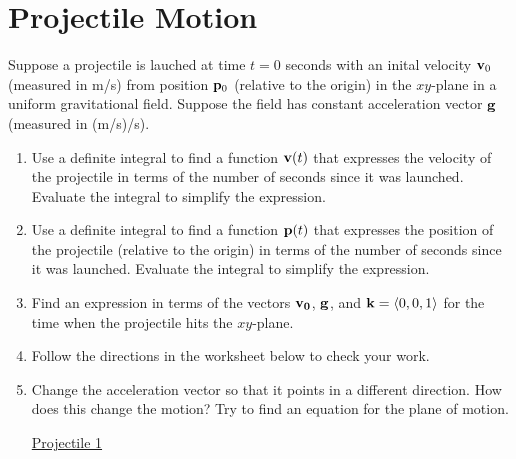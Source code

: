 \documentclass{ximera}
\begin{document}
\section{Projectile Motion}
\begin{question}  \label{Qerwer}
Suppose a projectile is lauched at time $t=0$ seconds with an inital velocity ${\bf v}_0$ (measured in m/s) from position ${\bf p}_0$ (relative to the origin) in the $xy$-plane in a uniform gravitational field. Suppose the field has constant acceleration vector ${\bf g}$ (measured in (m/s)/s).

\begin{enumerate}

\item Use a definite integral to find a function ${\bf v}(t)$ that expresses the velocity of the projectile in terms of the number of seconds since it was launched. Evaluate the integral to simplify the expression.

\item Use a definite integral to find a function ${\bf p}(t)$ that expresses the position of the projectile (relative to the origin) in terms of the number of seconds since it was launched. Evaluate the integral to simplify the expression.

\item Find an expression in terms of the vectors ${\bf v_0}$, ${\bf g}$, and ${\bf k}=\langle 0,0,1 \rangle$ for the time when the projectile hits the $xy$-plane.

\item Follow the directions in the worksheet below to check your work.

\item Change the acceleration vector so that it points in a different direction. How does this change the motion? Try to find an equation for the plane of motion. 

\begin{onlineOnly}
    \begin{center}
\end{center}
\end{onlineOnly}

\href{https://www.desmos.com/3d/csovv2cwn4}{Projectile 1}

\end{enumerate} 

\end{question}
\end{document}
